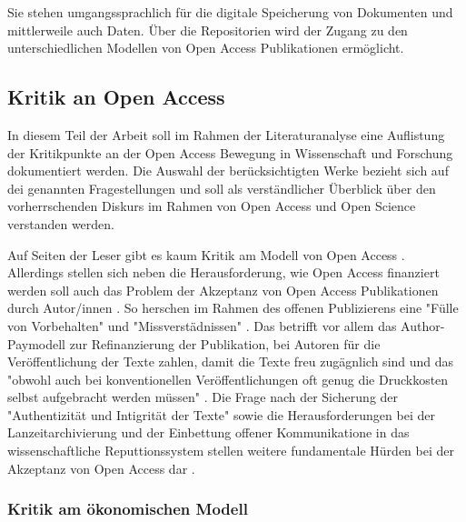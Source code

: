 Sie stehen umgangssprachlich für die digitale Speicherung von Dokumenten und mittlerweile auch Daten. Über die Repositorien wird der Zugang zu den unterschiedlichen Modellen von Open Access Publikationen ermöglicht.

\subsection{Kritik an Open Access}

In diesem Teil der Arbeit soll im Rahmen der Literaturanalyse eine Auflistung der Kritikpunkte an der Open Access Bewegung in Wissenschaft und Forschung dokumentiert werden. Die Auswahl der berücksichtigten Werke bezieht sich auf dei genannten Fragestellungen und soll als verständlicher Überblick über den vorherrschenden Diskurs im Rahmen von Open Access und Open Science verstanden werden.

Auf Seiten der Leser gibt es kaum Kritik am Modell von Open Access \cite{weishaupt_2009_goldenOA}. Allerdings stellen sich neben die Herausforderung, wie Open Access finanziert werden soll auch das Problem der Akzeptanz von Open Access Publikationen durch Autor/innen \cite{weishaupt_2009_goldenOA}. So herschen im Rahmen des offenen Publizierens eine "Fülle von Vorbehalten" und "Missverstädnissen" \cite{Suber_2002}. Das betrifft vor allem das Author-Paymodell zur Refinanzierung der Publikation, bei Autoren für die Veröffentlichung der Texte zahlen, damit die Texte freu zugägnlich sind \cite{suchen} und das "obwohl auch bei konventionellen Veröffentlichungen oft genug die Druckkosten selbst aufgebracht werden müssen" \cite{weishaupt_2009_goldenOA}. Die Frage nach der Sicherung der "Authentizität und Intigrität der Texte" \cite{weishaupt_2009_goldenOA} sowie die Herausforderungen bei der Lanzeitarchivierung und der Einbettung offener Kommunikatione in das wissenschaftliche Reputtionssystem stellen weitere fundamentale Hürden bei der Akzeptanz von Open Access dar\cite{weishaupt_2009_goldenOA} \cite{Suber_2002} \cite{Adema_2014_open_access}.

\subsubsection{Kritik am ökonomischen Modell}

